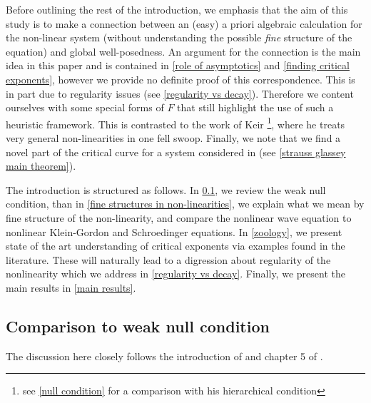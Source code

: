 \documentclass[11pt, oneside]{amsart}
\begin{document}
	
	Before outlining the rest of the introduction, we emphasis that the aim of this study is to make a connection between an (easy) a priori algebraic calculation for the non-linear system  (without understanding the possible \textit{fine} structure of the equation) and global well-posedness. An argument for the connection is the main idea in this paper and is contained in \cref{role of asymptotics} and \cref{finding critical exponents}, however we provide no definite proof of this correspondence. This is in part due to regularity issues (see \cref{regularity vs decay}). Therefore we content ourselves with some special forms of $F$ that still highlight the use of such a heuristic framework. This is contrasted to the work of Keir \cite{keir_weak_2018}\footnote{see \cref{null condition} for a comparison with his hierarchical condition}, where he treats very general non-linearities in one fell swoop. Finally, we note that we find a novel part of the critical curve for a system considered in \cite{hidano_combined_2016} (see \cref{strauss glassey main theorem}).
	
	The introduction is structured as follows. In \cref{comparison to weak null}, we review the weak null condition, than in \cref{fine structures in non-linearities}, we explain what we mean by fine structure of the non-linearity, and compare the nonlinear wave equation to nonlinear Klein-Gordon and Schroedinger equations. In \cref{zoology}, we present state of the art understanding of critical exponents via examples found in the literature. These will naturally lead to a digression about regularity of the nonlinearity which we address in \cref{regularity vs decay}. Finally, we present the main results in \cref{main results}.


	\subsection{Comparison to weak null condition}\label{comparison to weak null}
	The discussion here closely follows the introduction of \cite{deng_global_2018} and chapter 5 of \cite{keir_weak_2018}.
	
\end{document}
